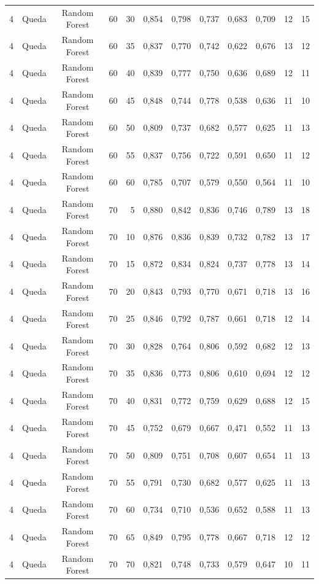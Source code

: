 \begin{longtable}{ccclrrrrrrrr}
4 & Queda & Random Forest & 60 & 30 & 0,854 & 0,798 & 0,737 & 0,683 & 0,709 & 12 & 15 \\
4 & Queda & Random Forest & 60 & 35 & 0,837 & 0,770 & 0,742 & 0,622 & 0,676 & 13 & 12 \\
4 & Queda & Random Forest & 60 & 40 & 0,839 & 0,777 & 0,750 & 0,636 & 0,689 & 12 & 11 \\
4 & Queda & Random Forest & 60 & 45 & 0,848 & 0,744 & 0,778 & 0,538 & 0,636 & 11 & 10 \\
4 & Queda & Random Forest & 60 & 50 & 0,809 & 0,737 & 0,682 & 0,577 & 0,625 & 11 & 13 \\
4 & Queda & Random Forest & 60 & 55 & 0,837 & 0,756 & 0,722 & 0,591 & 0,650 & 11 & 12 \\
4 & Queda & Random Forest & 60 & 60 & 0,785 & 0,707 & 0,579 & 0,550 & 0,564 & 11 & 10 \\
4 & Queda & Random Forest & 70 & 5 & 0,880 & 0,842 & 0,836 & 0,746 & 0,789 & 13 & 18 \\
4 & Queda & Random Forest & 70 & 10 & 0,876 & 0,836 & 0,839 & 0,732 & 0,782 & 13 & 17 \\
4 & Queda & Random Forest & 70 & 15 & 0,872 & 0,834 & 0,824 & 0,737 & 0,778 & 13 & 14 \\
4 & Queda & Random Forest & 70 & 20 & 0,843 & 0,793 & 0,770 & 0,671 & 0,718 & 13 & 16 \\
4 & Queda & Random Forest & 70 & 25 & 0,846 & 0,792 & 0,787 & 0,661 & 0,718 & 12 & 14 \\
4 & Queda & Random Forest & 70 & 30 & 0,828 & 0,764 & 0,806 & 0,592 & 0,682 & 12 & 13 \\
4 & Queda & Random Forest & 70 & 35 & 0,836 & 0,773 & 0,806 & 0,610 & 0,694 & 12 & 12 \\
4 & Queda & Random Forest & 70 & 40 & 0,831 & 0,772 & 0,759 & 0,629 & 0,688 & 12 & 15 \\
4 & Queda & Random Forest & 70 & 45 & 0,752 & 0,679 & 0,667 & 0,471 & 0,552 & 11 & 13 \\
4 & Queda & Random Forest & 70 & 50 & 0,809 & 0,751 & 0,708 & 0,607 & 0,654 & 11 & 13 \\
4 & Queda & Random Forest & 70 & 55 & 0,791 & 0,730 & 0,682 & 0,577 & 0,625 & 11 & 13 \\
4 & Queda & Random Forest & 70 & 60 & 0,734 & 0,710 & 0,536 & 0,652 & 0,588 & 11 & 13 \\
4 & Queda & Random Forest & 70 & 65 & 0,849 & 0,795 & 0,778 & 0,667 & 0,718 & 12 & 12 \\
4 & Queda & Random Forest & 70 & 70 & 0,821 & 0,748 & 0,733 & 0,579 & 0,647 & 10 & 11 \\

\end{longtable}

